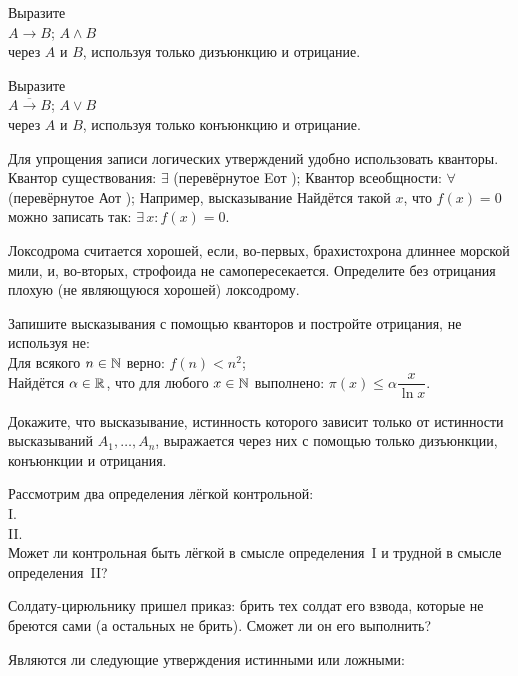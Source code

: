 \documentclass[12pt]{article}
\begin{document}
Выразите\\
$A\to B$;
$A\wedge B$\\
через $A$ и $B$, используя только дизъюнкцию и отрицание.

Выразите\\
$\overline{A\to B}$;
$A\vee B$\\
через $A$ и $B$, используя только конъюнкцию и отрицание.
\vfill
{}
\newpage

Для упрощения записи логических утверждений удобно использовать  кванторы.
Квантор существования: {$\exists$} (перевёрнутое  E от \rm); Квантор всеобщности: {$\forall$} (перевёрнутое  А от \rm);
Например, высказывание  Найдётся такой $x$, что $f(x)=0$ можно записать так:  $\exists\, x \colon f(x) = 0$.

Локсодрома считается хорошей, если, во-первых, брахистохрона длиннее морской мили, и, во-вторых, строфоида не самопересекается. Определите без отрицания плохую (не являющуюся хорошей) локсодрому.

Запишите высказывания с помощью кванторов и постройте отрицания, не используя  не:\\
Для всякого $n\in \mathbb{N}$ верно: $f(n) < n^2$; \\
Найдётся $\alpha\in\mathbb{R}$, что для любого $x\in\mathbb{N}$ выполнено: $\pi(x) \le \alpha \dfrac{x}{\ln x}$.

Докажите, что высказывание, истинность которого зависит
только от истинности высказываний $A_1,\dots,A_n$,
выражается через них с помощью только дизъюнкции, конъюнкции и отрицания.

 Рассмотрим два определения лёгкой контрольной:\\
\hbox{\phantom{bbbbbbbbbb}}
I. \\
\hbox{\phantom{bbbbbbbbb}}
II. \\
Может ли контрольная быть лёгкой в смысле определения~I и трудной в смысле
определения~II?

Солдату-цирюльнику пришел приказ: брить тех солдат его взвода,
которые не бреются сами (а остальных не брить). Сможет ли он его выполнить?

Являются ли следующие утверждения истинными или ложными:\\
\phantom{\rule{0mm}{7mm}}\hfil
\hbox{}
\hfil\hfil
\hbox{}
\hfil
{}
\end{document}
